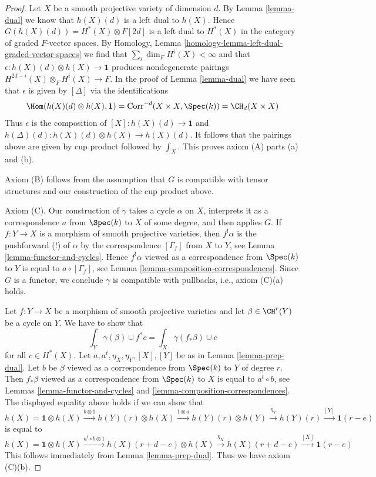 \begin{proof}
\medskip\noindent
Let $X$ be a smooth projective variety of dimension $d$.
By Lemma \ref{lemma-dual}
we know that $h(X)(d)$ is a left dual to $h(X)$. Hence
$G(h(X)(d)) = H^*(X) \otimes F[2d]$ is a left dual to
$H^*(X)$ in the category of graded $F$-vector spaces.
By Homology, Lemma \ref{homology-lemma-left-dual-graded-vector-spaces}
we find that $\sum_i \dim_F H^i(X) < \infty$ and that
$\epsilon : h(X)(d) \otimes h(X) \to \mathbf{1}$ produces
nondegenerate pairings $H^{2d - i}(X) \otimes_F H^i(X) \to F$.
In the proof of Lemma \ref{lemma-dual} we have seen that
$\epsilon$ is given by $[\Delta]$ via the identifications
$$
\Hom(h(X)(d) \otimes h(X), \mathbf{1}) =
\text{Corr}^{-d}(X \times X, \Spec(k)) =
\CH_d(X \times X)
$$
Thus $\epsilon$ is the composition of $[X] : h(X)(d) \to \mathbf{1}$
and $h(\Delta)(d) : h(X)(d) \otimes h(X) \to h(X)(d)$. It follows
that the pairings above are given by cup product followed by
$\int_X$. This proves axiom (A) parts (a) and (b).

\medskip\noindent
Axiom (B) follows from the assumption that $G$ is compatible
with tensor structures and our construction of the cup product above.

\medskip\noindent
Axiom (C). Our construction of $\gamma$ takes a cycle $\alpha$ on $X$,
interprets it as a correspondence $a$ from $\Spec(k)$ to $X$ of some degree,
and then applies $G$. If $f : Y \to X$ is a morphism of smooth projective
varieties, then $f^!\alpha$ is the pushforward (!) of $\alpha$
by the correspondence $[\Gamma_f]$ from $X$ to $Y$, see
Lemma \ref{lemma-functor-and-cycles}. Hence
$f^!\alpha$ viewed as a correspondence from $\Spec(k)$ to $Y$
is equal to $a \circ [\Gamma_f]$, see
Lemma \ref{lemma-composition-correspondences}.
Since $G$ is a functor, we conclude
$\gamma$ is compatible with pullbacks, i.e., axiom (C)(a) holds.

\medskip\noindent
Let $f : Y \to X$ be a morphism of smooth projective varieties and
let $\beta \in \CH^r(Y)$ be a cycle on $Y$. We have to show that
$$
\int_Y \gamma(\beta) \cup f^*c = \int_X \gamma(f_*\beta) \cup c
$$
for all $c \in H^*(X)$. Let $a, a^t, \eta_X, \eta_Y, [X], [Y]$
be as in Lemma \ref{lemma-prep-dual}.
Let $b$ be $\beta$ viewed as a correspondence from $\Spec(k)$ to $Y$
of degree $r$. Then $f_*\beta$ viewed as a correspondence from
$\Spec(k)$ to $X$ is equal to $a^t \circ b$, see
Lemmas \ref{lemma-functor-and-cycles} and
\ref{lemma-composition-correspondences}.
The displayed equality above holds if we can show that
$$
h(X) = \mathbf{1} \otimes h(X)
\xrightarrow{b \otimes 1}
h(Y)(r) \otimes h(X)
\xrightarrow{1 \otimes a}
h(Y)(r) \otimes h(Y)
\xrightarrow{\eta_Y}
h(Y)(r)
\xrightarrow{[Y]}
\mathbf{1}(r - e)
$$
is equal to
$$
h(X) = \mathbf{1} \otimes h(X)
\xrightarrow{a^t \circ b \otimes 1}
h(X)(r + d - e) \otimes h(X)
\xrightarrow{\eta_X}
h(X)(r + d - e)
\xrightarrow{[X]}
\mathbf{1}(r - e)
$$
This follows immediately from Lemma \ref{lemma-prep-dual}.
Thus we have axiom (C)(b).


\end{proof}
